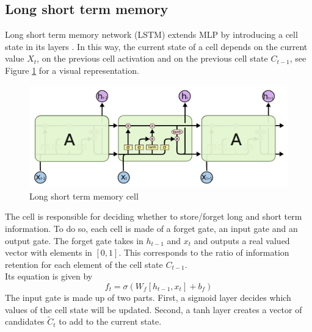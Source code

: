
\subsection{Long short term memory}

Long short term memory network (LSTM) extends MLP by introducing a cell state in its layers \cite{hochreiter1997long}. In this way, the current state of a cell depends on the current value $X_t$, on the previous cell activation and on the previous cell state $C_{t-1}$, see Figure \ref{fig:lstm_cell} for a visual representation. 
\begin{figure}[!ht]
    \includegraphics[width=\textwidth]{images/lstm_cell.png}
    \caption{Long short term memory cell \cite{Han2024}}
    \label{fig:lstm_cell}
\end{figure}
The cell is responsible for deciding whether to store/forget long and short term information. To do so, each cell is made of a forget gate, an input gate and an output gate.
The forget gate takes in $h_{t-1}$ and $x_t$ and outputs a real valued vector with elements in $[0,1]$. This corresponds to the ratio of information retention for each element of the cell state $C_{t-1}$.
\\
Its equation is given by
\begin{equation}
    f_t=\sigma(W_f[h_{t-1},x_t]+b_f)
\end{equation}
The input gate is made up of two parts. First, a sigmoid layer decides which values of the cell state will be updated. Second, a tanh layer creates a vector of candidates $\tilde{C}_t$ to add to the current state.
